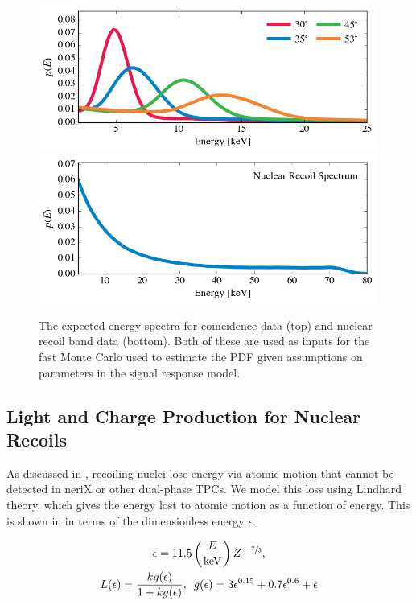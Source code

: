 \begin{figure}[t]
        \centering
	\includegraphics[width=0.99\textwidth]{nerix_energy_spectrum_coin}
	\includegraphics[width=0.99\textwidth]{nerix_energy_spectrum_band}
	\caption{The expected energy spectra for coincidence data (top) and nuclear recoil band data (bottom).  Both of these are used as inputs for the fast Monte Carlo used to estimate the PDF given assumptions on parameters in the signal response model.}
	\label{fig:nerix_mc_energy_spectra}
\end{figure}


\subsection{Light and Charge Production for Nuclear Recoils}
\label{sec:nerix_observables_production}

As discussed in , recoiling nuclei lose energy via atomic motion that cannot be detected in neriX or other dual-phase TPCs.  We model this loss using Lindhard theory, which gives the energy lost to atomic motion as a function of energy.  This is shown in  in terms of the dimensionless energy $\epsilon$.

\begin{equation}
        \label{eqn:nerix_lindhard}
        \begin{gathered}
                \epsilon = 11.5 \left( \frac{E}{\textrm{keV}} \right) Z^{\sfrac{-7}{3}}, \\
                L(\epsilon) = \frac{k g(\epsilon)}{1 + k g(\epsilon)}, \, \, \, g(\epsilon) = 3 \epsilon^{0.15} + 0.7 \epsilon^{0.6} + \epsilon
        \end{gathered}
\end{equation}

